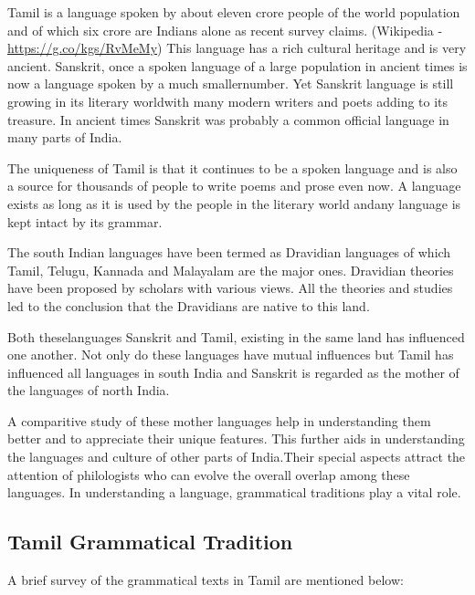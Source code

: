 Tamil is a language spoken by about eleven crore people of the world population and of which six crore are Indians alone as recent survey claims. (Wikipedia - \url{https://g.co/kgs/RvMeMy}) This language has a rich cultural heritage and is very ancient. Sanskrit, once a spoken language of a large population in ancient times is now a language spoken by a much smallernumber. Yet Sanskrit language is still growing in its literary worldwith many modern writers and poets adding to its treasure. In ancient times Sanskrit was probably a common official language in many parts of India.

The uniqueness of Tamil is that it continues to be a spoken language and is also a source for thousands of people to write poems and prose even now. A language exists as long as it is used by the people in the literary world andany language is kept intact by its grammar.

The south Indian languages have been termed as Dravidian languages of which Tamil, Telugu, Kannada and Malayalam are the major ones. Dravidian theories have been proposed by scholars with various views. All the theories and studies led to the conclusion that the Dravidians are native to this land.

Both theselanguages Sanskrit and Tamil, existing in the same land has influenced one another. Not only do these languages have mutual influences but Tamil has influenced all languages in south India and Sanskrit is regarded as the mother of the languages of north India.

A comparitive study of these mother languages help in understanding them better and to appreciate their unique features. This further aids in understanding the languages and culture of other parts of India.Their special aspects attract the attention of philologists who can evolve the overall overlap among these languages. In understanding a language, grammatical traditions play a vital role.


\subsection*{Tamil Grammatical Tradition}

A brief survey of the grammatical texts in Tamil are mentioned below:

